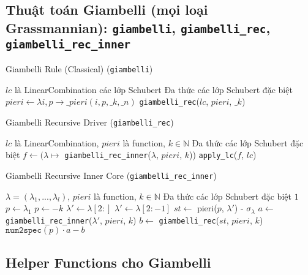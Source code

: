 
\subsection*{Thuật toán Giambelli (mọi loại Grassmannian): \texttt{giambelli}, \texttt{giambelli\_rec}, \texttt{giambelli\_rec\_inner}}

\begin{algorithm}[H]
\caption{Giambelli Rule (Classical) (\texttt{giambelli})}
\begin{algorithmic}[1]
\REQUIRE $lc$ là LinearCombination các lớp Schubert
\ENSURE Đa thức các lớp Schubert đặc biệt
\STATE $pieri \gets \lambda i, p \to \_pieri(i, p, \_k, \_n)$
\RETURN \texttt{giambelli\_rec}($lc$, $pieri$, $\_k$)
\end{algorithmic}
\end{algorithm}

\begin{algorithm}[H]
\caption{Giambelli Recursive Driver (\texttt{giambelli\_rec})}
\begin{algorithmic}[1]
\REQUIRE $lc$ là LinearCombination, $pieri$ là function, $k \in \mathbb{N}$
\ENSURE Đa thức các lớp Schubert đặc biệt
\STATE $f \gets (\lambda \mapsto$ \texttt{giambelli\_rec\_inner}($\lambda$, $pieri$, $k$))
\RETURN \texttt{apply\_lc}($f$, $lc$)
\end{algorithmic}
\end{algorithm}

\begin{algorithm}[H]
\caption{Giambelli Recursive Inner Core (\texttt{giambelli\_rec\_inner})}
\begin{algorithmic}[1]
\REQUIRE $\lambda = (\lambda_1, ..., \lambda_l)$, $pieri$ là function, $k \in \mathbb{N}$
\ENSURE Đa thức các lớp Schubert đặc biệt
    \RETURN $1$
\ENDIF
\STATE $p \gets \lambda_1$
    \STATE $p \gets -k$
\ENDIF
\STATE $\lambda' \gets \lambda[2:]$
    \STATE $\lambda' \gets \lambda[2:-1]$
\ENDIF
\STATE $st \gets$ pieri($p$, $\lambda'$) - $\sigma_\lambda$
\STATE $a \gets$ \texttt{giambelli\_rec\_inner}($\lambda'$, $pieri$, $k$)
\STATE $b \gets$ \texttt{giambelli\_rec}($st$, $pieri$, $k$)
\RETURN $\texttt{num2spec}(p) \cdot a - b$
\end{algorithmic}
\end{algorithm}

\subsection*{Helper Functions cho Giambelli}

